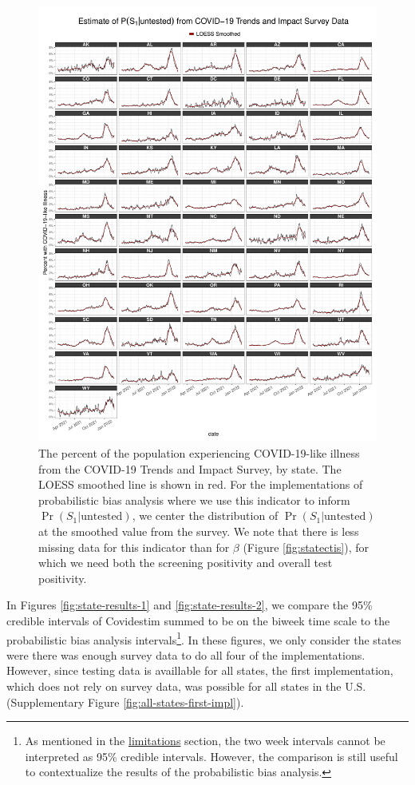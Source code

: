 \documentclass[12pt,twoside]{smiththesis}
\begin{document}
\begin{figure}
\includegraphics[width=1\linewidth]{figure/ctis_s_untested_states} \caption{\label{fig:statectis-s-untested} The percent of the population experiencing COVID-19-like illness from the COVID-19 Trends and Impact Survey, by state. The LOESS smoothed line is shown in red. For the implementations of probabilistic bias analysis where we use this indicator to inform $\Pr(S_1|\text{untested})$, we center the distribution of $\Pr(S_1|\text{untested})$ at the smoothed value from the survey. We note that there is less missing data for this indicator than for $\beta$ (Figure \ref{fig:statectis}), for which we need both the screening positivity and overall test positivity.}\label{fig:unnamed-chunk-63}
\end{figure}
In Figures \ref{fig:state-results-1} and \ref{fig:state-results-2}, we compare the 95\% credible intervals of Covidestim summed to be on the biweek time scale to the probabilistic bias analysis intervals\footnote{As mentioned in the \protect\hyperlink{lims}{limitations} section, the two week intervals cannot be interpreted as 95\% credible intervals. However, the comparison is still useful to contextualize the results of the probabilistic bias analysis.}. In these figures, we only consider the states were there was enough survey data to do all four of the implementations. However, since testing data is availlable for all states, the first implementation, which does not rely on survey data, was possible for all states in the U.S. (Supplementary Figure \ref{fig:all-states-first-impl}).
\end{document}

